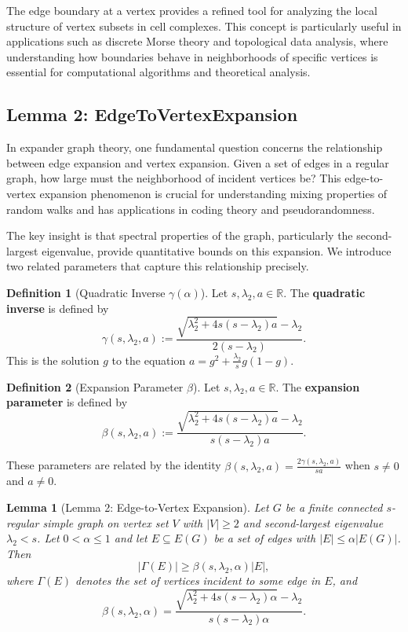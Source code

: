 \documentclass[11pt]{article}
\theoremstyle{plain}
\newtheorem*{lemma}{Lemma}
\theoremstyle{definition}
\newtheorem*{definition}{Definition}
\theoremstyle{remark}
\begin{document}
The edge boundary at a vertex provides a refined tool for analyzing the local structure of vertex subsets in cell complexes. This concept is particularly useful in applications such as discrete Morse theory and topological data analysis, where understanding how boundaries behave in neighborhoods of specific vertices is essential for computational algorithms and theoretical analysis.

\vspace{1em}

\subsection{Lemma 2: EdgeToVertexExpansion}

In expander graph theory, one fundamental question concerns the relationship between edge expansion and vertex expansion. Given a set of edges in a regular graph, how large must the neighborhood of incident vertices be? This edge-to-vertex expansion phenomenon is crucial for understanding mixing properties of random walks and has applications in coding theory and pseudorandomness.

The key insight is that spectral properties of the graph, particularly the second-largest eigenvalue, provide quantitative bounds on this expansion. We introduce two related parameters that capture this relationship precisely.

\begin{definition}[Quadratic Inverse $\gamma(\alpha)$]
Let $s, \lambda_2, a \in \mathbb{R}$. The \textbf{quadratic inverse} is defined by
\[
\gamma(s, \lambda_2, a) := \frac{\sqrt{\lambda_2^2 + 4s(s - \lambda_2)a} - \lambda_2}{2(s - \lambda_2)}.
\]
This is the solution $g$ to the equation $a = g^2 + \frac{\lambda_2}{s}g(1-g)$.
\end{definition}

\begin{definition}[Expansion Parameter $\beta$]
Let $s, \lambda_2, a \in \mathbb{R}$. The \textbf{expansion parameter} is defined by
\[
\beta(s, \lambda_2, a) := \frac{\sqrt{\lambda_2^2 + 4s(s - \lambda_2)a} - \lambda_2}{s(s-\lambda_2)a}.
\]
\end{definition}

These parameters are related by the identity $\beta(s, \lambda_2, a) = \frac{2\gamma(s, \lambda_2, a)}{sa}$ when $s \neq 0$ and $a \neq 0$.

\begin{lemma}[Lemma 2: Edge-to-Vertex Expansion]
Let $G$ be a finite connected $s$-regular simple graph on vertex set $V$ with $|V| \geq 2$ and second-largest eigenvalue $\lambda_2 < s$. Let $0 < \alpha \leq 1$ and let $E \subseteq E(G)$ be a set of edges with $|E| \leq \alpha|E(G)|$. Then
\[
|\Gamma(E)| \geq \beta(s, \lambda_2, \alpha)|E|,
\]
where $\Gamma(E)$ denotes the set of vertices incident to some edge in $E$, and
\[
\beta(s, \lambda_2, \alpha) = \frac{\sqrt{\lambda_2^2 + 4s(s-\lambda_2)\alpha} - \lambda_2}{s(s-\lambda_2)\alpha}.
\]
\end{lemma}
\end{document}
